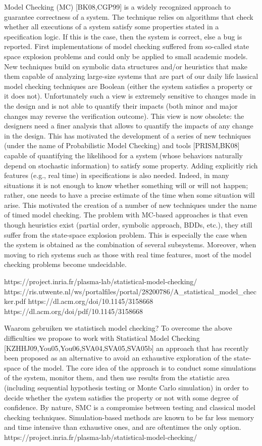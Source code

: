 Model Checking (MC) [BK08,CGP99] is a widely recognized approach to guarantee correctness of a system. The technique relies on algorithms that check whether all executions of a system satisfy some properties stated in a specification logic. If this is the case, then the system is correct, else a bug is reported.
First implementations of model checking suffered from so-called state space explosion problems and could only be applied to small academic models. New techniques build on symbolic data structures and/or heuristics that make them capable of analyzing large-size systems that are part of our daily life
lassical model checking techniques are Boolean (either the system satisfies a property or it does not). Unfortunately such a view is extremely sensitive to changes made in the design and is not able to quantify their impacts (both minor and major changes may reverse the verification outcome).  This view is now obsolete: the designers need a finer analysis that allows to quantify the impacts of any change in the design. This has motivated the development of a series of new techniques (under the name of Probabilistic Model Checking) and tools [PRISM,BK08] capable of quantifying the likelihood for a system (whose behaviors naturally depend on stochastic information) to satisfy some property.  Adding explicitly rich features (e.g., real time) in specifications is also needed. Indeed, in many situations it is not enough to know whether something will or will not happen; rather, one needs to have a precise estimate of the time when some situation will arise. This motivated the creation of a number of new techniques under the name of timed model checking. 
The problem with MC-based approaches is that even though heuristics exist (partial order, symbolic approach, BDDs, etc.), they still suffer from the state-space explosion problem. This is especially the case when the system is obtained as the combination of several subsystems. Moreover, when moving to rich systems such as those with real time features, most of the model checking problems become undecidable.

https://project.inria.fr/plasma-lab/statistical-model-checking/
https://ris.utwente.nl/ws/portalfiles/portal/28200786/A_statistical_model_checker.pdf
https://dl.acm.org/doi/10.1145/3158668
https://dl.acm.org/doi/pdf/10.1145/3158668

Waarom gebruiken we statistisch model checking?
To overcome the above difficulties we propose to work with Statistical Model Checking [KZHHJ09,You05,You06,SVA04,SVA05,SVA05b] an approach that has recently been proposed as an alternative to avoid an exhaustive exploration of the state-space of the model. The core idea of the approach is to conduct some simulations of the system, monitor them, and then use results from the statistic area (including sequential hypothesis testing or Monte Carlo simulation) in order to decide whether the system satisfies the property or not with some degree of confidence. By nature, SMC is a compromise between testing and classical model checking techniques. Simulation-based methods are known to be far less memory and time intensive than exhaustive ones, and are oftentimes the only option. 
https://project.inria.fr/plasma-lab/statistical-model-checking/

